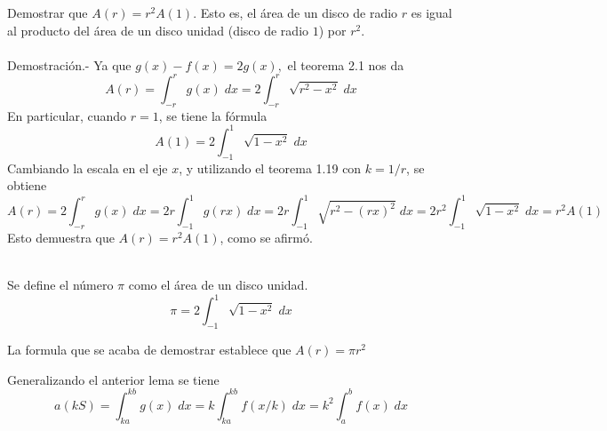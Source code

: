     \begin{lema} Demostrar que $A(r) = r^2 A(1)$. Esto es, el área de un disco de radio $r$ es igual al producto del área de un disco unidad (disco de radio $1$) por $r^2$.\\\\
	Demostración.-\; Ya que $g(x) - f(x) = 2g(x),$ el teorema 2.1 nos da 
	    $$A(r) = \int_{-r}^r g(x) \; dx = 2 \int_{-r}^r \sqrt{r^2 - x^2} \; dx$$
	    En particular, cuando $r = 1$, se tiene la fórmula $$A(1) = 2\int_{-1}^1 \sqrt{1 - x^2} \; dx$$
	    Cambiando la escala en el eje $x$, y utilizando el teorema 1.19 con $k=1/r$, se obtiene
	    $$A(r) = 2\int_{-r}^r g(x) \; dx = 2r \int_{-1}^1 g(rx) \; dx = 2r\int_{-1}^1 \sqrt{r^2 - (rx)^2} \; dx = 2r^2 \int_{-1}^1 \sqrt{1-x^2} \; dx = r^2 A(1)$$
	    Esto demuestra que $A(r) = r^2 A(1)$, como se afirmó.\\\\
    \end{lema}

\begin{tcolorbox}[colframe = white]
    \begin{def.} Se define el número $\pi$ como el área de un disco unidad.
	$$\pi = 2 \int_{-1}^1 \sqrt{1-x^2}\; dx$$
    \end{def.}
\end{tcolorbox}
\begin{center}
    La formula que se acaba de demostrar establece que $A(r) = \pi r^2$\\
\end{center}

\begin{tcolorbox}[colframe = white]
Generalizando el anterior lema se tiene 
    $$a(kS) = \int_{ka}^{kb} g(x)\; dx = k \int_{ka}^{kb} f(x/k) \; dx = k^2 \int_a^b f(x) \; dx$$
\end{tcolorbox}

